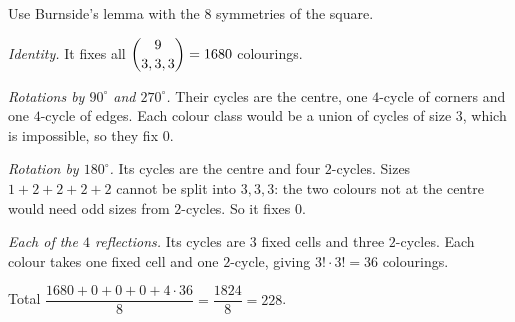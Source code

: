 Use Burnside's lemma with the $8$ symmetries of the square.

\emph{Identity.} It fixes all $\dbinom{9}{3,3,3}=1680$ colourings.

\emph{Rotations by $90^\circ$ and $270^\circ$.} Their cycles are the centre, one $4$-cycle of corners and one $4$-cycle of edges. Each colour class would be a union of cycles of size $3$, which is impossible, so they fix $0$.

\emph{Rotation by $180^\circ$.} Its cycles are the centre and four $2$-cycles. Sizes $1+2+2+2+2$ cannot be split into $3,3,3$: the two colours not at the centre would need odd sizes from $2$-cycles. So it fixes $0$.

\emph{Each of the $4$ reflections.} Its cycles are $3$ fixed cells and three $2$-cycles. Each colour takes one fixed cell and one $2$-cycle, giving $3!\cdot3!=36$ colourings.

Total $\dfrac{1680+0+0+0+4\cdot36}{8}=\dfrac{1824}8=\boxed{228}$.
